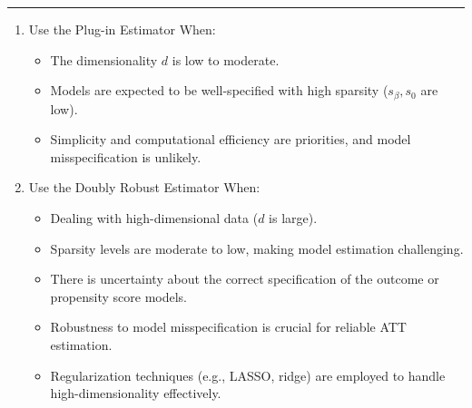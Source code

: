 \documentclass{article}
\newenvironment{colorparagraph}[1]{\par\color{#1}}{\par}
\begin{document}
\begin{enumerate}
\begin{colorparagraph}{questioncolor}
\rule{\textwidth}{0.5pt}
\end{colorparagraph}

\begin{enumerate}
      \item Use the Plug-in Estimator When:
        \begin{itemize}
          \item The dimensionality \( d \) is low to moderate.
          \item Models are expected to be well-specified with high sparsity (\( s_\beta, s_0 \) are low).
          \item Simplicity and computational efficiency are priorities, and model misspecification is unlikely.
        \end{itemize}
      \item Use the Doubly Robust Estimator When:
        \begin{itemize}
          \item Dealing with high-dimensional data (\( d \) is large).
          \item Sparsity levels are moderate to low, making model estimation challenging.
          \item There is uncertainty about the correct specification of the outcome or propensity score models.
          \item Robustness to model misspecification is crucial for reliable ATT estimation.
          \item Regularization techniques (e.g., LASSO, ridge) are employed to handle high-dimensionality effectively.
        \end{itemize}
      \end{enumerate}
\end{enumerate}
\end{document}
